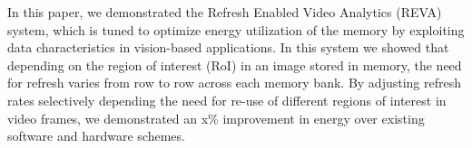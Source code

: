 In this paper, we demonstrated the Refresh Enabled Video Analytics (REVA) system, which is tuned to optimize energy utilization of the memory by exploiting data characteristics in vision-based applications. In this system we showed that depending on the region of interest (RoI) in an image stored in memory, the need for refresh varies from row to row across each memory bank. By adjusting refresh rates selectively depending the need for re-use of different regions of interest in video frames, we demonstrated an x\% improvement in energy over existing software and hardware schemes.
